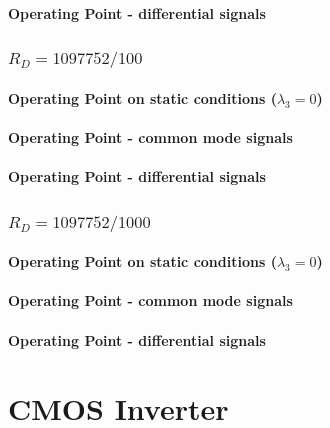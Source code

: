 \documentclass[10pt,a4paper]{book}
\begin{document}
\subsubsection{Operating Point - differential signals}



\subsection{$R_D = 1097752/100$}
\subsubsection{Operating Point on static conditions ($\lambda_3 = 0$)}



\subsubsection{Operating Point - common mode signals}



\subsubsection{Operating Point - differential signals}



\subsection{$R_D = 1097752/1000$}
\subsubsection{Operating Point on static conditions ($\lambda_3 = 0$)}



\subsubsection{Operating Point - common mode signals}



\subsubsection{Operating Point - differential signals}



\chapter{CMOS Inverter}
\end{document}
